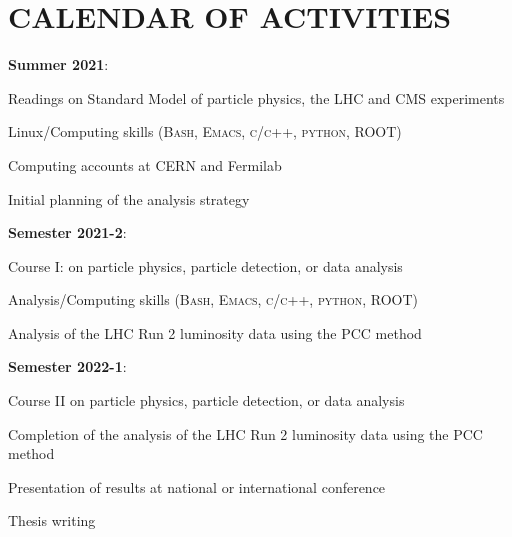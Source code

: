 \documentclass[final,12pt]{article}
\newcommand{\SubItem}[1]{ {\setlength\itemindent{15pt} \item[-] #1} }
\begin{document}
\section{CALENDAR OF ACTIVITIES}

\begin{itemize}

\item {\bf Summer 2021}:
  \SubItem{ Readings on Standard Model of particle physics,  the LHC and CMS experiments}
  \SubItem{ Linux/Computing skills (\textsc{Bash, Emacs, c/c++, python, ROOT})}
  \SubItem{ Computing accounts at CERN and Fermilab}
  \SubItem{ Initial planning of the analysis strategy}

\item {\bf Semester 2021-2}:
  \SubItem{ Course I: on particle physics, particle detection, or data analysis}
  \SubItem{ Analysis/Computing skills (\textsc{Bash, Emacs, c/c++, python, ROOT})}
  \SubItem{ Analysis of the LHC Run 2 luminosity data using the PCC method}

\item {\bf Semester 2022-1}:
  \SubItem{ Course II on particle physics, particle detection, or  data analysis}
  \SubItem{ Completion of the analysis of the LHC Run 2 luminosity data using the PCC method}
  \SubItem{ Presentation of results at national or international conference}
  \SubItem{ Thesis writing}

  
\end{itemize}


\onehalfspacing


\end{document}
